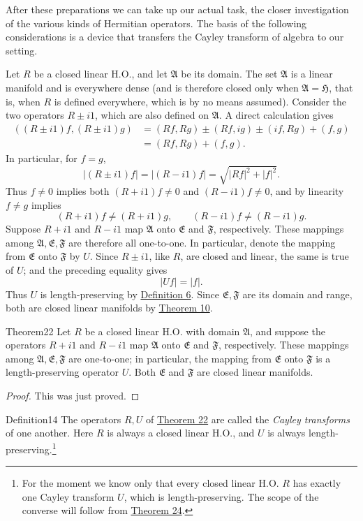 ﻿\documentclass[paper=b5,fontsize=13pt,bookmarkpackage=false,twoside]{scrartcl}
\begin{document}
After these preparations we can take up our actual task, the closer investigation of the various kinds of Hermitian operators. The basis of the following considerations is a device that transfers the Cayley transform of algebra to our setting.

Let $R$ be a closed linear H.O., and let $\mathfrak A$ be its domain. The set $\mathfrak A$ is a linear manifold and is everywhere dense (and is therefore closed only when $\mathfrak A=\mathfrak H$, that is, when $R$ is defined everywhere, which is by no means assumed). Consider the two operators $R\pm i1$, which are also defined on $\mathfrak A$. A direct calculation gives
\begin{align*}
((R\pm i1)f,(R\pm i1)g)
 &=(Rf,Rg)\pm(Rf,ig)\pm(if,Rg)+(f,g)\\
 &=(Rf,Rg)+(f,g).
\end{align*}
In particular, for $f=g$,
\[
|(R\pm i1)f|=|(R-i1)f|
=\sqrt{|Rf|^2+|f|^2}.
\]
Thus $f\ne0$ implies both $(R+i1)f\ne0$ and $(R-i1)f\ne0$, and by linearity $f\ne g$ implies
\[
(R+i1)f\ne(R+i1)g,\qquad
(R-i1)f\ne(R-i1)g.
\]
Suppose $R+i1$ and $R-i1$ map $\mathfrak A$ onto $\mathfrak E$ and $\mathfrak F$, respectively. These mappings among $\mathfrak A,\mathfrak E,\mathfrak F$ are therefore all one-to-one. In particular, denote the mapping from $\mathfrak E$ onto $\mathfrak F$ by $U$. Since $R\pm i1$, like $R$, are closed and linear, the same is true of $U$; and the preceding equality gives
\[
|Uf|=|f|.
\]
Thus $U$ is length-preserving by \hyperref[def:6]{Definition 6}. Since $\mathfrak E,\mathfrak F$ are its domain and range, both are closed linear manifolds by \hyperref[thm:10]{Theorem 10}.

\begin{namedstatement}{Theorem}{22}\label{thm:22}
Let $R$ be a closed linear H.O. with domain $\mathfrak A$, and suppose the operators $R+i1$ and $R-i1$ map $\mathfrak A$ onto $\mathfrak E$ and $\mathfrak F$, respectively. These mappings among $\mathfrak A,\mathfrak E,\mathfrak F$ are one-to-one; in particular, the mapping from $\mathfrak E$ onto $\mathfrak F$ is a length-preserving operator $U$. Both $\mathfrak E$ and $\mathfrak F$ are closed linear manifolds.
\end{namedstatement}

\begin{proof}
This was just proved.
\end{proof}

\begin{namedstatement}{Definition}{14}\label{def:14}
The operators $R,U$ of \hyperref[thm:22]{Theorem 22} are called the \emph{Cayley transforms} of one another. Here $R$ is always a closed linear H.O., and $U$ is always length-preserving.\footnote{\label{fn:42}For the moment we know only that every closed linear H.O. $R$ has exactly one Cayley transform $U$, which is length-preserving. The scope of the converse will follow from \hyperref[thm:24]{Theorem 24}.}
\end{namedstatement}
\end{document}
